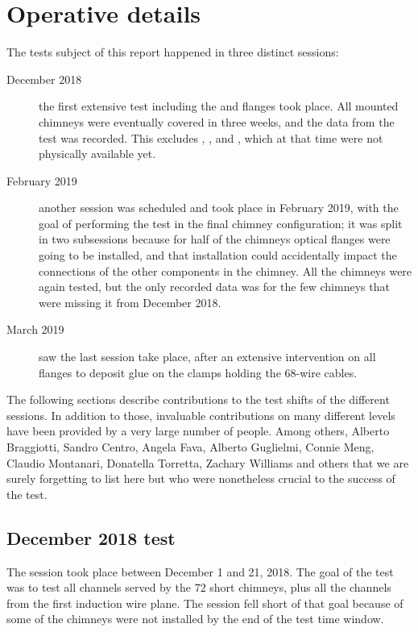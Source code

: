 \section{Operative details}
\label{sec:operations}


The tests subject of this report happened in three distinct sessions:
\begin{description}
  \item[December 2018] the first extensive test including the \DBB and flanges
    took place. All mounted chimneys were eventually covered in three weeks,
    and the data from the test was recorded.
    This excludes , ,  and
    , which at that time were not physically available yet.
  \item[February 2019] another session was scheduled and took place in February
    2019, with the goal of performing the test in the final chimney
    configuration; it was split in two subsessions because for half of the
    chimneys optical flanges were going to be installed, and that installation
    could accidentally impact the connections of the other components in the
    chimney. All the chimneys were again tested, but the only recorded data
    was for the few chimneys that were missing it from December 2018.
  \item[March 2019] saw the last session take place, after an extensive
    intervention on all flanges to deposit glue on the clamps holding the
    68-wire cables.
\end{description}


The following sections describe contributions to the test shifts of the
different sessions.
In addition to those, invaluable contributions on many different levels
have been provided by a very large number of people.
Among others, Alberto Braggiotti, Sandro Centro, Angela Fava, Alberto Guglielmi,
Connie Meng, Claudio Montanari, Donatella Torretta, Zachary Williams
and others that we are surely forgetting to list here but who were nonetheless
crucial to the success of the test.


\subsection{December 2018 test}
\label{ssec:operations:December2018}

The session took place between December 1 and 21, 2018.
The goal of the test was to test all channels served by the 72 short chimneys,
plus all the channels from the first induction wire plane. The session fell
short of that goal because of some of the chimneys were not installed by the end
of the test time window.

